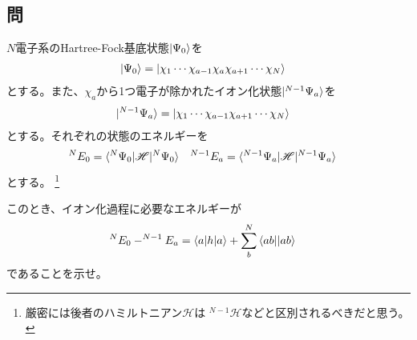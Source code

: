 \subsection{問}
$N$電子系のHartree-Fock基底状態$\ket{\Psi_0}$を
\begin{align}
	\ket{\Psi_0}
&=
	\ket{\chi_1 \cdots \chi_{a-1} \chi_a \chi_{a+1} \cdots \chi_N}
\end{align}
とする。また、$\chi_a$から1つ電子が除かれたイオン化状態$\ket{^{N-1}\Psi_a}$を
\begin{align}
	\ket{^{N-1}\Psi_a}
&=
	\ket{\chi_1 \cdots \chi_{a-1} \chi_{a+1} \cdots \chi_N}
\end{align}
とする。それぞれの状態のエネルギーを
\begin{align}
	^{N}E_0
&=
	\braket{^{N}\Psi_0|\mathscr{H}|^{N}\Psi_0} &
%
%
	^{N-1}E_a
&=
	\braket{^{N-1}\Psi_a|\mathscr{H}|^{N-1}\Psi_a}
\end{align}
とする。
	\footnote{
		厳密には後者のハミルトニアン$\mathscr{H}$は
		$^{N-1}\mathscr{H}$などと区別されるべきだと思う。
	}

このとき、イオン化過程に必要なエネルギーが
\begin{align}
	^{N}E_0
	-
	^{N-1}E_a
&=
	\braket{a|h|a}
	+
	\sum_b^N {\braket{ab||ab}}
\end{align}
であることを示せ。



